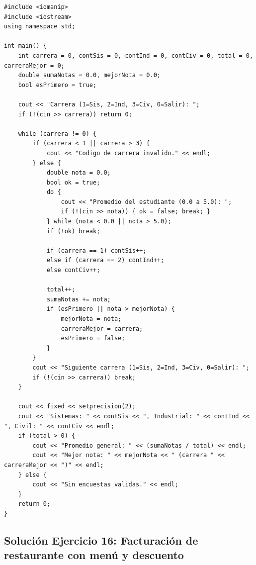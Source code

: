 \documentclass[11pt,letterpaper]{article}
\begin{document}
\begin{lstlisting}[style=cppmonitoria,caption={Solución Ejercicio 15: Estadísticas de encuesta sin arreglos (C++)}]
#include <iomanip>
#include <iostream>
using namespace std;

int main() {
    int carrera = 0, contSis = 0, contInd = 0, contCiv = 0, total = 0, carreraMejor = 0;
    double sumaNotas = 0.0, mejorNota = 0.0;
    bool esPrimero = true;

    cout << "Carrera (1=Sis, 2=Ind, 3=Civ, 0=Salir): ";
    if (!(cin >> carrera)) return 0;

    while (carrera != 0) {
        if (carrera < 1 || carrera > 3) {
            cout << "Codigo de carrera invalido." << endl;
        } else {
            double nota = 0.0;
            bool ok = true;
            do {
                cout << "Promedio del estudiante (0.0 a 5.0): ";
                if (!(cin >> nota)) { ok = false; break; }
            } while (nota < 0.0 || nota > 5.0);
            if (!ok) break;

            if (carrera == 1) contSis++;
            else if (carrera == 2) contInd++;
            else contCiv++;

            total++;
            sumaNotas += nota;
            if (esPrimero || nota > mejorNota) {
                mejorNota = nota;
                carreraMejor = carrera;
                esPrimero = false;
            }
        }
        cout << "Siguiente carrera (1=Sis, 2=Ind, 3=Civ, 0=Salir): ";
        if (!(cin >> carrera)) break;
    }

    cout << fixed << setprecision(2);
    cout << "Sistemas: " << contSis << ", Industrial: " << contInd << ", Civil: " << contCiv << endl;
    if (total > 0) {
        cout << "Promedio general: " << (sumaNotas / total) << endl;
        cout << "Mejor nota: " << mejorNota << " (carrera " << carreraMejor << ")" << endl;
    } else {
        cout << "Sin encuestas validas." << endl;
    }
    return 0;
}
\end{lstlisting}

\subsection{Solución Ejercicio 16: Facturación de restaurante con menú y descuento}
\end{document}
